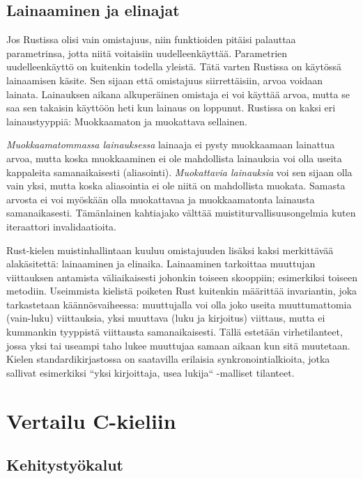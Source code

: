 \documentclass[finnish]{tktltiki2}
\theoremstyle{definition}
\theoremstyle{remark}
\begin{document}
\subsection{Lainaaminen ja elinajat}

Jos Rustissa olisi vain omistajuus, niin funktioiden pitäisi palauttaa parametrinsa, jotta niitä voitaisiin uudelleenkäyttää. Parametrien uudelleenkäyttö on kuitenkin todella yleistä. Tätä varten Rustissa on käytössä lainaamisen käsite. Sen sijaan että omistajuus siirrettäisiin, arvoa voidaan lainata. Lainauksen aikana alkuperäinen omistaja ei voi käyttää arvoa, mutta se saa sen takaisin käyttöön heti kun lainaus on loppunut. Rustissa on kaksi eri lainaustyyppiä: Muokkaamaton ja muokattava sellainen.

\textit{Muokkaamatommassa lainauksessa} lainaaja ei pysty muokkaamaan lainattua arvoa, mutta koska muokkaaminen ei ole mahdollista lainauksia voi olla useita kappaleita samanaikaisesti (aliasointi). \textit{Muokattavia lainauksia} voi sen sijaan olla vain yksi, mutta koska aliasointia ei ole niitä on mahdollista muokata. Samasta arvosta ei voi myöskään olla muokattavaa ja muokkaamatonta lainausta samanaikasesti. Tämänlainen kahtiajako välttää muistiturvallisuusongelmia kuten iteraattori invalidaatioita. 



Rust-kielen muistinhallintaan kuuluu omistajuuden lisäksi kaksi merkittävää alakäsitettä: lainaaminen ja elinaika. Lainaaminen tarkoittaa muuttujan viittauksen antamista väliaikaisesti johonkin toiseen skooppiin; esimerkiksi toiseen metodiin. Useimmista kielistä poiketen Rust kuitenkin määrittää invariantin, joka tarkastetaan käännösvaiheessa: muuttujalla voi olla joko useita muuttumattomia (vain-luku) viittauksia, yksi muuttava (luku ja kirjoitus) viittaus, mutta ei kummankin tyyppistä viittausta samanaikaisesti. Tällä estetään virhetilanteet, jossa yksi tai useampi taho lukee muuttujaa samaan aikaan kun sitä muutetaan. Kielen standardikirjastossa on saatavilla erilaisia synkronointialkioita, jotka sallivat esimerkiksi ``yksi kirjoittaja, usea lukija`` -malliset tilanteet.

\section{Vertailu C-kieliin}

\subsection{Kehitystyökalut}
\end{document}
